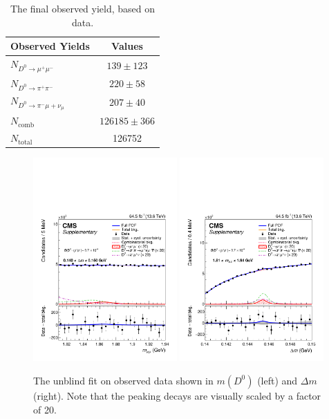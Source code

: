 \begin{table}[h!]
    \centering
    \begin{tabular}{|l|c|}
    \hline
    \textbf{Observed Yields} & \textbf{Values} \\
    \hline
    $N_{D^0 \rightarrow \mu^+\mu^-}$ & $139 \pm 123$ \\
    $N_{D^0 \rightarrow \pi^+\pi^-}$ & $220 \pm 58$ \\
    $N_{D^0 \rightarrow \pi^-\mu+\nu_\mu}$ & $207 \pm 40$ \\
    $N_{\text{comb}}$ & $126185 \pm 366$ \\
    $N_{\text{total}}$ & 126752 \\
    \hline
\end{tabular}
\caption{The final observed yield, based on data.}
\label{tab:final_observed_yeild}
\end{table}

\begin{figure}[h!]
    \begin{center}
      \includegraphics[width=0.49\textwidth]{figures/chapter4/results/SB_plot_m_full_test.pdf}
      \includegraphics[width=0.49\textwidth]{figures/chapter4/results/SB_plot_dm_full_test.pdf}\\
    \end{center}
    \caption{
      The unblind fit on observed data shown in $m(D^0)$ (left) and $\Delta m$ (right). Note that the peaking decays are visually scaled by a factor of 20.
    }
    \label{fig:final_observed_fit}
  \end{figure}